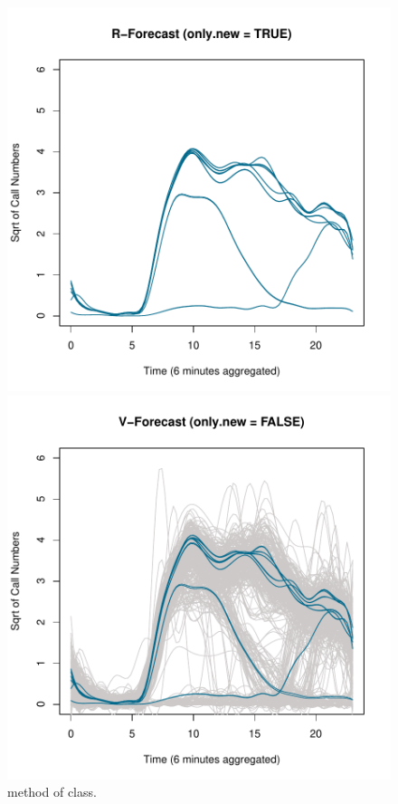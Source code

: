 \begin{figure}[h!]
	\centering
	\begin{minipage}{0.4\textwidth}
		\centering
		\includegraphics[width=\textwidth]{figures/Rfore.pdf}
	\end{minipage}%
	\begin{minipage}{0.4\textwidth}
		\centering
		\includegraphics[width=\textwidth]{figures/Vfore.pdf}
	\end{minipage}
	\caption{ method of  class.}
	\label{fig:forecast}
\end{figure}

